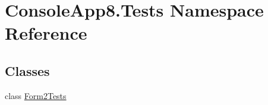\hypertarget{namespace_console_app8_1_1_tests}{}\section{Console\+App8.\+Tests Namespace Reference}
\label{namespace_console_app8_1_1_tests}
\subsection*{Classes}
\begin{DoxyCompactItemize}
\item 
class \mbox{\hyperlink{class_console_app8_1_1_tests_1_1_form2_tests}{Form2\+Tests}}
\end{DoxyCompactItemize}
